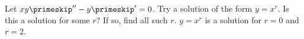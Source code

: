 {Let $xy\primeskip'' - y\primeskip' = 0$.  Try a solution of the form $y = x^r$.  Is this a
solution for some $r$?  If so, find all such $r$.}
{$y=x^r$ is a solution for $r=0$ and $r=2$.}